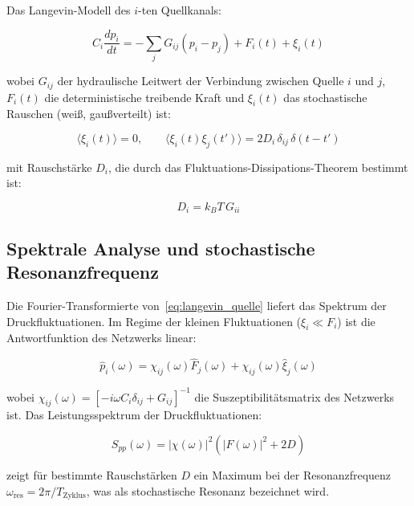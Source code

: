﻿\documentclass[12pt,a4paper]{report}
\begin{document}
Das Langevin-Modell des $i$-ten Quellkanals:

\begin{equation}
	C_i\frac{d p_i}{dt} = -\sum_j G_{ij}(p_i - p_j) + F_i(t) + \xi_i(t)
	\label{eq:langevin_quelle}
\end{equation}

wobei $G_{ij}$ der hydraulische Leitwert der Verbindung zwischen Quelle $i$ und $j$, $F_i(t)$ die deterministische treibende Kraft und $\xi_i(t)$ das stochastische Rauschen (weiß, gaußverteilt) ist:

\begin{equation}
	\langle\xi_i(t)\rangle = 0, \qquad \langle\xi_i(t)\xi_j(t')\rangle = 2D_i\,\delta_{ij}\,\delta(t-t')
	\label{eq:rauschen_statistik}
\end{equation}

mit Rauschstärke $D_i$, die durch das Fluktuations-Dissipations-Theorem bestimmt ist:

\begin{equation}
	D_i = k_BT\,G_{ii}
	\label{eq:fdt}
\end{equation}

\subsection{Spektrale Analyse und stochastische Resonanzfrequenz}

Die Fourier-Transformierte von~\eqref{eq:langevin_quelle} liefert das Spektrum der Druckfluktuationen. Im Regime der kleinen Fluktuationen ($\xi_i \ll F_i$) ist die Antwortfunktion des Netzwerks linear:

\begin{equation}
	\hat{p}_i(\omega) = \chi_{ij}(\omega)\hat{F}_j(\omega) + \chi_{ij}(\omega)\hat{\xi}_j(\omega)
	\label{eq:antwortfunktion}
\end{equation}
		
wobei $\chi_{ij}(\omega) = [-i\omega C_i\delta_{ij} + G_{ij}]^{-1}$ die Suszeptibilitätsmatrix des Netzwerks ist. Das Leistungsspektrum der Druckfluktuationen:

\begin{equation}
	S_{pp}(\omega) = |\chi(\omega)|^2\left(|F(\omega)|^2 + 2D\right)
	\label{eq:leistungsspektrum}
\end{equation}

zeigt für bestimmte Rauschstärken $D$ ein Maximum bei der Resonanzfrequenz $\omega_\mathrm{res} = 2\pi/T_\mathrm{Zyklus}$, was als stochastische Resonanz bezeichnet wird.
\end{document}
